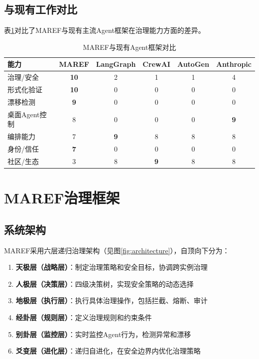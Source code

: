\subsection{与现有工作对比}

表\ref{tab:comparison}对比了MAREF与现有主流Agent框架在治理能力方面的差异。

\begin{table}[htbp]
\caption{MAREF与现有Agent框架对比}
\label{tab:comparison}
\begin{tabular}{lccccc}
\toprule
\textbf{能力} & \textbf{MAREF} & \textbf{LangGraph} & \textbf{CrewAI} & \textbf{AutoGen} & \textbf{Anthropic} \\
\midrule
治理/安全 & \textbf{10} & 2 & 1 & 1 & 4 \\
形式化验证 & \textbf{10} & 0 & 0 & 0 & 0 \\
漂移检测 & \textbf{9} & 0 & 0 & 0 & 0 \\
桌面Agent控制 & 8 & 0 & 0 & 0 & \textbf{9} \\
编排能力 & 7 & \textbf{9} & 8 & 8 & 8 \\
身份/信任 & \textbf{7} & 0 & 0 & 0 & 0 \\
社区/生态 & 3 & 8 & \textbf{9} & 8 & 8 \\
\bottomrule
\end{tabular}
\end{table}

\section{MAREF治理框架}

\subsection{系统架构}

MAREF采用六层递归治理架构（见图\ref{fig:architecture}），自顶向下分为：

\begin{enumerate}
    \item \textbf{天极层（战略层）}：制定治理策略和安全目标，协调跨实例治理
    \item \textbf{人极层（决策层）}：四级决策树，实现安全策略的动态选择
    \item \textbf{地极层（执行层）}：执行具体治理操作，包括拦截、熔断、审计
    \item \textbf{经卦层（规则层）}：定义治理规则和约束条件
    \item \textbf{别卦层（监控层）}：实时监控Agent行为，检测异常和漂移
    \item \textbf{爻变层（进化层）}：递归自进化，在安全边界内优化治理策略
\end{enumerate}

